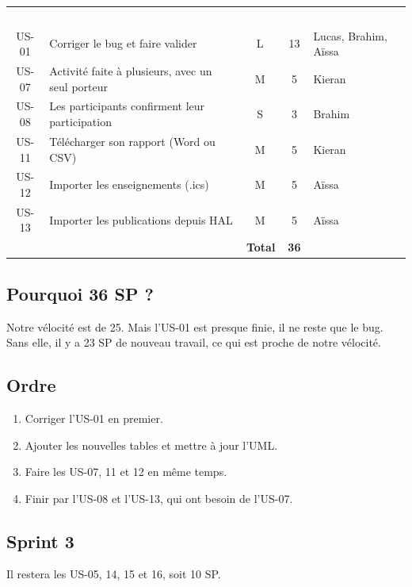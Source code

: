 \documentclass[11pt,a4paper]{article}
\newcommand{\entete}[1]{\textcolor{white}{\textbf{#1}}}
\begin{document}
\begin{center}
\begin{tabular}{c p{6.4cm} c c p{3.6cm}}
\rowcolor{bleu} \entete{US} & \entete{Ce que c'est} & \entete{Taille} & \entete{SP} & \entete{Qui} \\
US-01 & Corriger le bug et faire valider & L & 13 & Lucas, Brahim, Aïssa \\
\rowcolor{grisclair} US-07 & Activité faite à plusieurs, avec un seul porteur & M & 5 & Kieran \\
US-08 & Les participants confirment leur participation & S & 3 & Brahim \\
\rowcolor{grisclair} US-11 & Télécharger son rapport (Word ou CSV) & M & 5 & Kieran \\
US-12 & Importer les enseignements (.ics) & M & 5 & Aïssa \\
\rowcolor{grisclair} US-13 & Importer les publications depuis HAL & M & 5 & Aïssa \\
\multicolumn{3}{r}{\textbf{Total}} & \textbf{36} & \\
\end{tabular}
\end{center}

\subsection{Pourquoi 36 SP ?}

Notre vélocité est de 25. Mais l'US-01 est presque finie, il ne reste que le bug. Sans elle, il y a 23 SP de nouveau travail, ce qui est proche de notre vélocité.

\subsection{Ordre}

\begin{enumerate}
  \item Corriger l'US-01 en premier.
  \item Ajouter les nouvelles tables et mettre à jour l'UML.
  \item Faire les US-07, 11 et 12 en même temps.
  \item Finir par l'US-08 et l'US-13, qui ont besoin de l'US-07.
\end{enumerate}

\subsection{Sprint 3}

Il restera les US-05, 14, 15 et 16, soit 10 SP.
\end{document}

